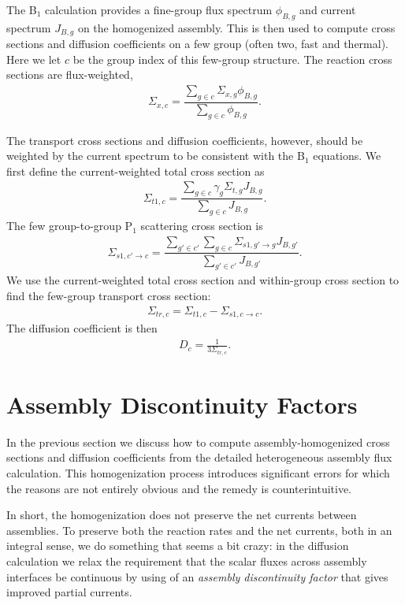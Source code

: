 The B$_1$ calculation provides a fine-group flux spectrum $\phi_{B,g}$  and current spectrum $J_{B,g}$ on the homogenized assembly. This is then used to compute cross sections and diffusion coefficients on a few group (often  two, fast and thermal). Here we let $c$ be the group index of this few-group structure. The reaction cross sections are flux-weighted,
\begin{align}
  \Sigma_{x,c} = \dfrac{ \displaystyle\sum_{ g \in c } \Sigma_{x,g} \phi_{B,g} }{ \displaystyle\sum_{ g \in c } \phi_{B,g} } .
\end{align}

The transport cross sections and diffusion coefficients, however, should be weighted by the current spectrum to be consistent with the B$_1$ equations. We first define the current-weighted total cross section as
\begin{align}
  \Sigma_{t1,c} = \dfrac{ \displaystyle\sum_{ g \in c } \gamma_g \Sigma_{t,g} J_{B,g} }{ \displaystyle\sum_{ g \in c } J_{B,g} } .
\end{align}
The few group-to-group P$_1$ scattering cross section is
\begin{align}
  \Sigma_{s1,c' \rightarrow c} = \dfrac{ \displaystyle\sum_{ g' \in c' } \displaystyle\sum_{ g \in c } \Sigma_{s1,g' \rightarrow g} J_{B,g'} }{ \displaystyle\sum_{ g' \in c' } J_{B,g'} } .
\end{align}
We use the current-weighted total cross section and within-group cross section to find the few-group transport cross section:
\begin{align}
  \Sigma_{tr,c} = \Sigma_{t1,c} - \Sigma_{s1,c \rightarrow c} .
\end{align}
The diffusion coefficient is then
\begin{align}
  D_c = \frac{1}{3 \Sigma_{tr,c} } .
\end{align}




\section{Assembly Discontinuity Factors}

In the previous section we discuss how to compute assembly-homogenized cross sections and diffusion coefficients from the detailed heterogeneous assembly flux calculation. This homogenization process introduces significant errors for which the reasons are not entirely obvious and the remedy is counterintuitive. 

In short, the homogenization does not preserve the net currents between assemblies. To preserve both the reaction rates and the net currents, both in an integral sense, we do something that seems a bit crazy: in the diffusion calculation we relax the requirement that the scalar fluxes across assembly interfaces be continuous by using of an \emph{assembly discontinuity factor} that gives improved partial currents. 

